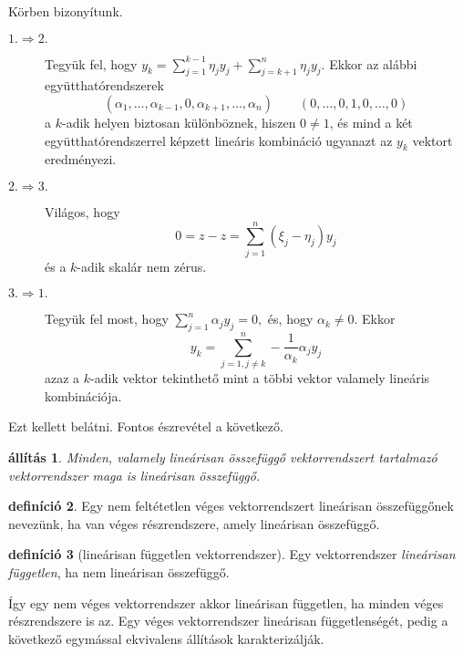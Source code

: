 \documentclass[9pt,showtrims]{memoir}
\makeatletter
\renewenvironment{proof}[1][\proofname]
    {\par\pushQED{\qed}%
    \normalfont \topsep6\p@\@plus6\p@\relax
    \trivlist
    \item[\hskip\labelsep
        \itshape
    #1\@addpunct{:}]\ignorespaces}
    {\popQED\endtrivlist\@endpefalse}
\theoremstyle{plain}
\newtheorem{proposition}{állítás}[chapter]
\theoremstyle{remark}
\theoremstyle{definition}
\newtheorem{definition}[proposition]{definíció}
\makeatother
\begin{document}
\begin{proof}
    Körben bizonyítunk.
    \begin{description}
        \item[$1.\Rightarrow 2.$] 
            Tegyük fel, hogy $y_k=\sum_{j=1}^{k-1}\eta_jy_j+\sum_{j=k+1}^n\eta_jy_j$.
            Ekkor az alábbi együtthatórendszerek
            \[
                \left( \alpha_1,\dots,\alpha_{k-1},0,\alpha_{k+1},\dots,\alpha_n \right)
                \qquad
                \left( 0,\dots,0,1,0,\dots,0 \right)
            \]
            a $k$-adik helyen biztosan különböznek, 
            hiszen $0\neq 1$, 
            és mind a két együtthatórendszerrel képzett lineáris kombináció ugyanazt az $y_k$ vektort eredményezi.
        \item[$2.\Rightarrow 3.$]
            Világos, hogy 
            \[
                0=z-z=
                \sum_{j=1}^n\left( \xi_j-\eta_j \right)y_j
            \]
            és a $k$-adik skalár nem zérus.
        \item[$3.\Rightarrow 1.$]
            Tegyük fel most, hogy 
            \(
            \sum_{j=1}^n\alpha_jy_j=0,
            \)
            és, hogy $\alpha_k\neq 0.$
            Ekkor 
            \[
                y_k=\sum_{j=1,j\neq k}^n-\frac{1}{\alpha_k}\alpha_jy_j
            \]
            azaz a $k$-adik vektor tekinthető mint a többi vektor valamely lineáris kombinációja.
    \end{description}
    Ezt kellett belátni. 
\end{proof}
Fontos észrevétel a következő.
\begin{proposition}
    Minden, 
    valamely lineárisan összefüggő vektorrendszert tartalmazó vektorrendszer maga is lineárisan összefüggő.
\end{proposition}
\begin{definition}
    Egy nem feltétetlen véges vektorrendszert lineárisan összefüggőnek nevezünk,
    ha van véges részrendszere, amely lineárisan összefüggő.
\end{definition}
\begin{definition}[lineárisan független vektorrendszer]
    Egy vektorrendszer \emph{lineárisan független}, ha nem lineárisan összefüggő.
\end{definition}
Így egy nem véges vektorrendszer akkor lineárisan független, ha minden véges részrendszere is az.
Egy véges vektorrendszer lineárisan függetlenségét, pedig a következő egymással ekvivalens állítások karakterizálják.
\end{document}
